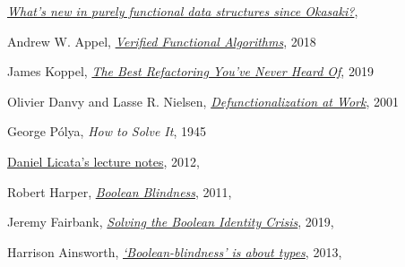 \documentclass[declaration,mgr,english,shortabstract]{iithesis}
\begin{document}
\begin{thebibliography}{1}
    \href{https://cstheory.stackexchange.com/questions/1539/whats-new-in-purely-functional-data-structures-since-okasaki}{\textit{What's new in purely functional data structures since Okasaki?}}, \\

    Andrew W. Appel,
    \href{https://softwarefoundations.cis.upenn.edu/vfa-current/index.html}{\textit{Verified Functional Algorithms}}, 2018

    James Koppel,
    \href{http://www.pathsensitive.com/2019/07/the-best-refactoring-youve-never-heard.html}{\textit{The Best Refactoring You've Never Heard Of}},
    2019

    Olivier Danvy and Lasse R. Nielsen,
    \href{https://www.brics.dk/RS/01/23/BRICS-RS-01-23.pdf}{\textit{Defunctionalization at Work}},
    2001

    George Pólya,
    \textit{How to Solve It},
    1945

    \href{https://www.cs.cmu.edu/~15150/previous-semesters/2012-spring/resources/lectures/09.pdf}{Daniel Licata's lecture notes},
    2012, \\

    Robert Harper,
    \href{https://existentialtype.wordpress.com/2011/03/15/boolean-blindness/}{\textit{Boolean Blindness}},
    2011, \\

    Jeremy Fairbank,
    \href{https://medium.com/swlh/solving-the-boolean-identity-crisis-33eeccde2c96}{\textit{Solving the Boolean Identity Crisis}},
    2019, \\

    Harrison Ainsworth,
    \href{http://www.hxa.name/notes/note-hxa7241-20131124T0927Z.html}{\textit{‘Boolean-blindness’ is about types}},
    2013, \\


\end{thebibliography}
\end{document}
